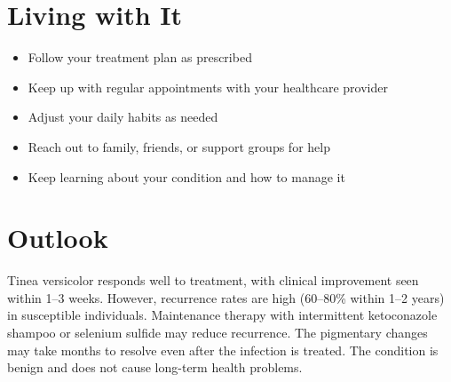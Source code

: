 \section{Living with It}

\begin{itemize}[noitemsep]
  \item Follow your treatment plan as prescribed
  \item Keep up with regular appointments with your healthcare provider
  \item Adjust your daily habits as needed
  \item Reach out to family, friends, or support groups for help
  \item Keep learning about your condition and how to manage it
\end{itemize}

\section{Outlook}
Tinea versicolor responds well to treatment, with clinical improvement seen within 1--3 weeks. However, recurrence rates are high (60--80\% within 1--2 years) in susceptible individuals. Maintenance therapy with intermittent ketoconazole shampoo or selenium sulfide may reduce recurrence. The pigmentary changes may take months to resolve even after the infection is treated. The condition is benign and does not cause long-term health problems.
